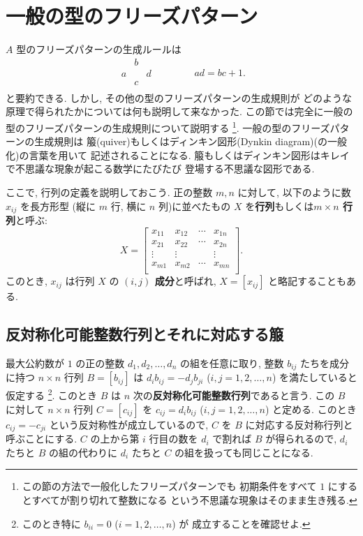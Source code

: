 \documentclass[12pt,twoside,dvipdfm]{jarticle}
\theoremstyle{definition} %
\theoremstyle{definition} %
\theoremstyle{definition} %
\numberwithin{theorem}{section}
\numberwithin{equation}{section}
\numberwithin{figure}{section}
\numberwithin{table}{section}
\begin{document}
\section{一般の型のフリーズパターン}
\label{sec:general-case}

$A$ 型のフリーズパターンの生成ルールは
\begin{equation*}
\begin{array}{ccc}
   & b &   \\
 a &   & d \\
   & c &   \\
\end{array}
\qquad\qquad
ad = bc+1.
\end{equation*} 
と要約できる. しかし, その他の型のフリーズパターンの生成規則が
どのような原理で得られたかについては何も説明して来なかった.
この節では完全に一般の型のフリーズパターンの生成規則について説明する%
\footnote{この節の方法で一般化したフリーズパターンでも
初期条件をすべて $1$ にするとすべてが割り切れて整数になる
という不思議な現象はそのまま生き残る.}.
一般の型のフリーズパターンの生成規則は
箙(quiver)もしくはディンキン図形(Dynkin diagram)(の一般化)の言葉を用いて
記述されることになる. 
箙もしくはディンキン図形はキレイで不思議な現象が起こる数学にたびたび
登場する不思議な図形である.

ここで, 行列の定義を説明しておこう. 
正の整数 $m,n$ に対して, 以下のように数 $x_{ij}$ を長方形型
(縦に $m$ 行, 横に $n$ 列)に並べたもの $X$ 
を{\bf 行列}もしくは{\bf $m\times n$ 行列}と呼ぶ:
\begin{equation*}
X = 
\begin{bmatrix}
 x_{11} & x_{12} & \cdots & x_{1n} \\
 x_{21} & x_{22} & \cdots & x_{2n} \\
 \vdots & \vdots &        & \vdots \\
 x_{m1} & x_{m2} & \cdots & x_{mn} \\
\end{bmatrix}.
\end{equation*}
このとき, $x_{ij}$ は行列 $X$ の {\bf $(i,j)$ 成分}と呼ばれ, 
$X=[x_{ij}]$ と略記することもある.


\subsection{反対称化可能整数行列とそれに対応する箙}

最大公約数が $1$ の正の整数 $d_1,d_2,\ldots,d_n$ の組を任意に取り, 
整数 $b_{ij}$ たちを成分に持つ $n\times n$ 行列 $B=[b_{ij}]$ 
は $d_i b_{ij} = - d_j b_{ji}$ ($i,j=1,2,\ldots,n$) を満たしていると仮定する%
\footnote{このとき特に $b_{ii}=0$ ($i=1,2,\ldots,n$) が
成立することを確認せよ.}. 
このとき $B$ は $n$ 次の{\bf 反対称化可能整数行列}であると言う.
この $B$ に対して $n\times n$ 行列 $C=[c_{ij}]$ 
を $c_{ij} = d_i b_{ij}$ ($i,j=1,2,\ldots,n$) と定める.
このとき $c_{ij}=-c_{ji}$ という反対称性が成立しているので,  
$C$ を $B$ に対応する反対称行列と呼ぶことにする.
$C$ の上から第 $i$ 行目の数を $d_i$ で割れば $B$ が得られるので, 
$d_i$ たちと $B$ の組の代わりに $d_i$ たちと $C$ の組を扱っても同じことになる.
\end{document}
